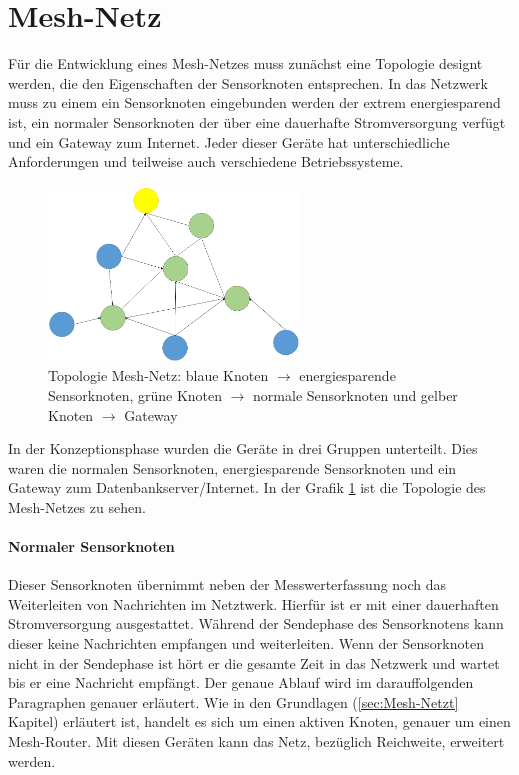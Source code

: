 \section{Mesh-Netz}
\label{sec:KonzeptionMeshNetz}
Für die Entwicklung eines Mesh-Netzes muss zunächst eine Topologie designt werden, die den Eigenschaften der Sensorknoten entsprechen. In das Netzwerk muss zu einem ein Sensorknoten eingebunden werden der extrem energiesparend ist, ein normaler Sensorknoten der über eine dauerhafte Stromversorgung verfügt und ein Gateway zum Internet. Jeder dieser Geräte hat unterschiedliche Anforderungen und teilweise auch verschiedene Betriebssysteme. 
\begin{figure}
	\centering
	\includegraphics[width=0.6\textwidth]{bilder/konzeptionMeshTopologie}
	\caption[Topologie Mesh-Netz]{Topologie Mesh-Netz: blaue Knoten $\rightarrow$ energiesparende Sensorknoten, grüne Knoten $\rightarrow$ normale Sensorknoten und gelber Knoten $\rightarrow$ Gateway}
	\label{img:konzeptionTopologie}
\end{figure}

In der Konzeptionsphase wurden die Geräte in drei Gruppen unterteilt. Dies waren die normalen Sensorknoten, energiesparende Sensorknoten und ein Gateway zum Datenbankserver/Internet. In der Grafik \ref{img:konzeptionTopologie} ist die Topologie des Mesh-Netzes zu sehen.
\paragraph{Normaler Sensorknoten} Dieser Sensorknoten übernimmt neben der Messwerterfassung noch das Weiterleiten von Nachrichten im Netztwerk. Hierfür ist er mit einer dauerhaften Stromversorgung ausgestattet. Während der Sendephase des Sensorknotens kann dieser keine Nachrichten empfangen und weiterleiten. Wenn der Sensorknoten nicht in der Sendephase ist hört er die gesamte Zeit in das Netzwerk und wartet bis er eine Nachricht empfängt. Der genaue Ablauf wird im darauffolgenden Paragraphen genauer erläutert. Wie in den Grundlagen (\ref{sec:Mesh-Netzt} Kapitel) erläutert ist, handelt es sich um einen aktiven Knoten, genauer um einen Mesh-Router. Mit diesen Geräten kann das Netz, bezüglich Reichweite, erweitert werden.
